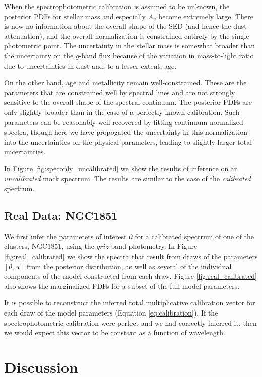 \documentclass[iop,numberedappendix]{emulateapj}
\newcommand{\excluster}{NGC1851}
\begin{document}
When the spectrophotometric calibration is assumed to be unknown,
the posterior PDFs for stellar mass and especially $A_v$ become
extremely large.  There is now no information about the overall shape
of the SED (and hence the dust attenuation), and the overall
normalization is constrained entirely by the single photometric point.
The uncertainty in the stellar mass is somewhat broader than the
uncertainty on the $g$-band flux because of the variation in
mass-to-light ratio due to uncertainties in dust and, to a lesser
extent, age.

On the other hand, age and metallicity remain well-constrained.  These
are the parameters that are constrained well by spectral lines and are
not strongly sensitive to the overall shape of the spectral continuum.
The posterior PDFs are only slightly broader than in the case of a
perfectly known calibration. Such parameters can be reasonably well
recovered by fitting continuum normalized spectra, though here we have
propogated the uncertainty in this normalization into the
uncertainties on the physical parameters, leading to slightly larger
total uncertainties.

In Figure \ref{fig:speconly_uncalibrated} we show the results of
inference on an \emph{uncalibrated} mock spectrum.  The results are
similar to the case of the \emph{calibrated} spectrum.


\subsection{Real Data: \excluster} 
We first infer the parameters of interest $\theta$ for a calibrated
spectrum of one of the clusters, \excluster, using the $griz$-band
photometry. In Figure \ref{fig:real_calibrated} we show the spectra
that result from draws of the parameters $[\theta,\alpha]$ from the
posterior distribution, as well as several of the individual
components of the model constructed from each draw. Figure
\ref{fig:real_calibrated} also shows the marginalized PDFs for a
subset of the full model parameters.

It is possible to reconstruct the inferred total multiplicative
calibration vector for each draw of the model parameters (Equation
\ref{eq:calibration}). If the spectrophotometric calibration were
perfect and we had correctly inferred it, then we would expect this
vector to be constant as a function of wavelength.


\section{Discussion}
\end{document}
